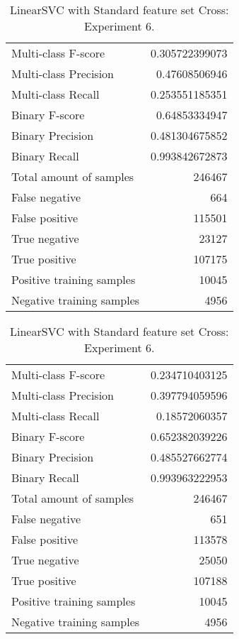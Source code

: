 \begin{table}[H]
\begin{minipage}{0.5\textwidth}
\caption{LinearSVC with Standard feature set Cross: Experiment 5.}
\centering
\begin{tabular}{l r}
\toprule
Multi-class F-score & 0.305722399073 \\
Multi-class Precision & 0.47608506946 \\
Multi-class Recall & 0.253551185351 \\
\midrule
Binary F-score & 0.64853334947 \\
Binary Precision & 0.481304675852 \\
Binary Recall & 0.993842672873 \\
\midrule
Total amount of samples & 246467 \\
False negative & 664 \\
False positive & 115501 \\
True negative & 23127 \\
True positive & 107175 \\
\midrule
Positive training samples & 10045 \\
Negative training samples & 4956 \\
\bottomrule
\end{tabular}
\end{minipage}
\hfillx
\begin{minipage}{0.5\textwidth}
\caption{LinearSVC with Standard feature set Cross: Experiment 6.}
\centering
\begin{tabular}{l r}
\toprule
Multi-class F-score & 0.234710403125 \\
Multi-class Precision & 0.397794059596 \\
Multi-class Recall & 0.18572060357 \\
\midrule
Binary F-score & 0.652382039226 \\
Binary Precision & 0.485527662774 \\
Binary Recall & 0.993963222953 \\
\midrule
Total amount of samples & 246467 \\
False negative & 651 \\
False positive & 113578 \\
True negative & 25050 \\
True positive & 107188 \\
\midrule
Positive training samples & 10045 \\
Negative training samples & 4956 \\
\bottomrule
\end{tabular}
\end{minipage}
\end{table}
